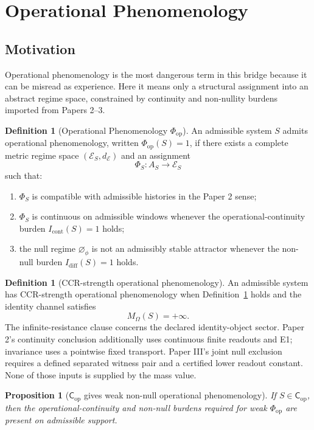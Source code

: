 \documentclass[11pt,a4paper]{article}
\newtheorem{proposition}[theorem]{Proposition}
\theoremstyle{definition}
\newtheorem{definition}[theorem]{Definition}
\newcommand{\Cop}{\mathsf{C}_{\mathrm{op}}}
\newcommand{\Phiop}{\Phi_{\mathrm{op}}}
\newcommand{\Aset}{A_S}
\newcommand{\MO}{M_\Omega}
\newcommand{\Espace}{\mathcal{E}}
\newcommand{\Icont}{I_{\mathrm{cont}}}
\newcommand{\Idiff}{I_{\mathrm{diff}}}
\newcommand{\Null}{\varnothing_{\phi}}
\begin{document}
\section{Operational Phenomenology}

\subsection{Motivation}
Operational phenomenology is the most dangerous term in this bridge because it can be misread as experience. Here it means only a structural assignment into an abstract regime space, constrained by continuity and non-nullity burdens imported from Papers 2--3.

\begin{definition}[Operational Phenomenology $\Phiop$]\label{def:phi-op}
An admissible system $S$ admits operational phenomenology, written $\Phiop(S)=1$, if there exists a complete metric regime space $(\Espace_S,d_{\Espace})$ and an assignment
\[
\Phi_S:\Aset\to\Espace_S
\]
such that:
\begin{enumerate}[leftmargin=1.5em]
\item $\Phi_S$ is compatible with admissible histories in the Paper 2 sense;
\item $\Phi_S$ is continuous on admissible windows whenever the operational-continuity burden $\Icont(S)=1$ holds;
\item the null regime $\Null$ is not an admissibly stable attractor whenever the non-null burden $\Idiff(S)=1$ holds.
\end{enumerate}
\end{definition}

\begin{definition}[CCR-strength operational phenomenology]\label{def:phi-ccr}
An admissible system has CCR-strength operational phenomenology when Definition~\ref{def:phi-op} holds and the identity channel satisfies
\[
\MO(S)=+\infty.
\]
The infinite-resistance clause concerns the declared identity-object sector.
Paper 2's continuity conclusion additionally uses continuous finite readouts
and E1; invariance uses a pointwise fixed transport. Paper III's joint null
exclusion requires a defined separated witness pair and a certified lower
readout constant. None of those inputs is supplied by the mass value.
\end{definition}

\begin{proposition}[$\Cop$ gives weak non-null operational phenomenology]\label{prop:weak-phi}
If $S\in\Cop$, then the operational-continuity and non-null burdens required for weak $\Phiop$ are present on admissible support.
\end{proposition}
\end{document}
